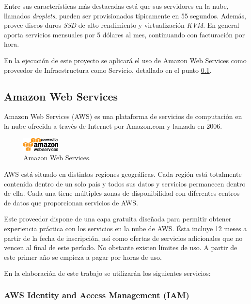 Entre sus características más destacadas está que sus servidores en la nube, llamados \textit{droplets}, pueden ser provisionados típicamente en 55 segundos. Además, provee discos duros \textit{SSD} de alto rendimiento y virtualización \textit{KVM}. En general aporta servicios mensuales por 5 dólares al mes, continuando con facturación por hora.

En la ejecución de este proyecto se aplicará el uso de Amazon Web Services como proveedor de Infraestructura como Servicio, detallado en el punto \ref{subAWS}.

\subsection{Amazon Web Services} \label{subAWS}

Amazon Web Services (AWS) es una plataforma de servicios de computación en la nube ofrecida a través de Internet por Amazon.com y lanzada en 2006.

\begin{figure}[H]
\centering
\includegraphics[width=0.17\textwidth]{images/figures/aws.png}
\caption{Amazon Web Services.\footnotemark}
\end{figure}


AWS está situado en distintas regiones geográficas. Cada región está totalmente contenida dentro de un solo país y todos sus datos y servicios permanecen dentro de ella. Cada una tiene múltiples zonas de disponibilidad con diferentes centros de datos que proporcionan servicios de AWS.

Este proveedor dispone de una capa gratuita diseñada para permitir obtener experiencia práctica con los servicios en la nube de AWS. Ésta incluye 12 meses a partir de la fecha de inscripción, así como ofertas de servicios adicionales que no vencen al final de este período. No obstante existen límites de uso. A partir de este primer año se empieza a pagar por horas de uso.

En la elaboración de este trabajo se utilizarán los siguientes servicios:

\subsubsection{AWS Identity and Access Management (IAM)}

